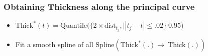 \documentclass[9 pt]{beamer}
\begin{document}
\begin{frame}
\frametitle{Obtaining Thickness along the principal curve}
\begin{itemize}
\item $\text{Thick}^*(t)=\text{Quantile}\big(\{2\times \text{dist}_{t_{j}},\big||t_{j}-t|\le.02\}\ 0.95\big)$
\item Fit a smooth spline of all $\text{Spline}(\text{Thick}^*(.)\longrightarrow\ \text{Thick}(.))$
\end{itemize}
\begin{figure}[ht]
\begin{minipage}[b]{0.45\linewidth}
\centering
{}
\end{minipage}
\begin{minipage}[b]{0.45\linewidth}
\centering
{}

\end{minipage}
\end{figure}
\end{frame}
\end{document}
